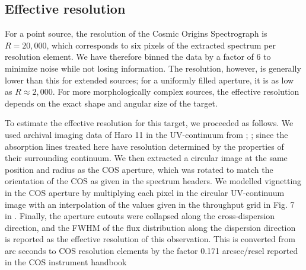 \documentclass[twocolumn]{aastex61}
\begin{document}
\subsection{Effective resolution}\label{effective-resolution}

For a point source, the resolution of the Cosmic Origins Spectrograph is
$R=20,000$, which corresponds to six pixels of the extracted spectrum
per resolution element. We have therefore binned the data by a factor of
6 to minimize noise while not losing information. The resolution,
however, is generally lower than this for extended sources; for a
uniformly filled aperture, it is as low as $R\approx2,000$. For more
morphologically complex sources, the effective resolution depends on the
exact shape and angular size of the target.

To estimate the effective resolution for this target, we proceeded as
follows. We used archival imaging data of Haro 11 in the UV-continuum
from \citet{Ostlin2009}; \citet{Hayes2009}; since the absorption lines
treated here have resolution determined by the properties of their
surrounding continuum. We then extracted a circular image at the same
position and radius as the COS aperture, which was rotated to match the
orientation of the COS as given in the spectrum headers. We modelled
vignetting in the COS aperture by multiplying each pixel in the circular
UV-continuum image with an interpolation of the values given in the
throughput grid in Fig. 7 in \citet{CosImaging}. Finally, the aperture
cutouts were collapsed along the cross-dispersion direction, and the
FWHM of the flux distribution along the dispersion direction is reported
as the effective resolution of this observation. This is converted from
arc seconds to COS resolution elements by the factor 0.171 arcsec/resel
reported in the COS instrument handbook \citep{CosHandbook}
\end{document}

